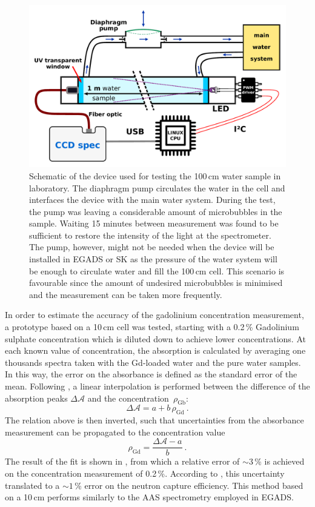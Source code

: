 \begin{figure}
	\centering
	\includegraphics[width=0.7\linewidth]{pics/Device.pdf}
	\caption[Schematic of the device used for testing the 100\,cm water sample]%
		{Schematic of the device used for testing the 100\,cm water sample in laboratory.
		The diaphragm pump circulates the water in the cell and interfaces the device with the main water system.
		During the test, the pump was leaving a considerable amount of microbubbles in the sample.
		Waiting 15 minutes between measurement was found to be sufficient to restore the intensity of the light at %
		the spectrometer.
		The pump, however, might not be needed when the device will be installed in EGADS or SK as the %
		pressure of the water system will be enough to circulate water and fill the 100\,cm cell.
		This scenario is favourable since the amount of undesired microbubbles is minimised and the %
		measurement can be taken more frequently.}
	\label{fig:gad_device}
\end{figure}

In order to estimate the accuracy of the gadolinium concentration measurement, %
a prototype based on a 10\,cm cell was tested, starting with a 0.2\,\% Gadolinium sulphate concentration %
which is diluted down to achieve lower concentrations.
At each known value of concentration, the absorption is calculated by averaging one thousands spectra %
taken with the Gd-loaded water and the pure water samples.
In this way, the error on the absorbance is defined as the standard error of the mean.
Following , a linear interpolation is performed between the difference of the absorption peaks %
$\Delta \mathcal{A}$ and the concentration~$\rho_\text{Gb}$: 
\begin{equation}
	\Delta \mathcal{A} = a + b\,\rho_\text{Gd}\ .
\end{equation}
The relation above is then inverted, such that uncertainties from the absorbance measurement %
can be propagated to the concentration value
\begin{equation}
	\rho_\text{Gd} = \frac{\Delta \mathcal{A} - a}{b}\ .
\end{equation}
The result of the fit is shown in , from which a relative error of $\sim3$\,\% %
is achieved on the concentration measurement of 0.2\,\%.
According to , this uncertainty translated to a $\sim1$\,\% error on the neutron capture efficiency.
This method based on a 10\,cm performs similarly to the AAS spectrometry employed in EGADS.

